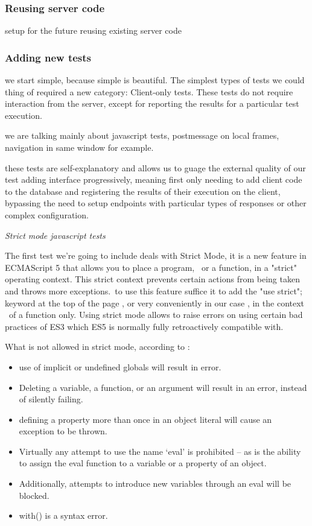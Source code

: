 \subsubsection{Reusing server code}
setup for the future
reusing existing server code

\subsubsection{Adding new tests}

we start simple, because simple is beautiful. The simplest types of tests we could thing of required a new category: Client-only tests.
These tests do not require interaction from the server, except for reporting the results for a particular test execution.

we are talking mainly about javascript tests, postmessage on local frames, navigation in same window for example.

these tests are self-explanatory and allows us to guage the external quality of our test adding interface progressively, meaning first only needing
to add client code to the database and registering the results of their execution on the client, bypassing the need to setup endpoints with particular types
of responses or other complex configuration. 

\emph{Strict mode javascript tests}

The first test we're going to include deals with Strict Mode, it is a new feature in ECMAScript 5 that allows you to place a program, \
or a function, in a "strict" operating context. This strict context prevents certain actions from being taken and throws more exceptions.\
to use this feature suffice it to add the  "use strict"; keyword at the top of the page , or very conveniently in our case , in the context \
of a function only. Using strict mode allows to raise errors on using certain bad practices of ES3 which ES5 is normally fully retroactively compatible with.\

What is not allowed in strict mode, according to \cite{resig}:
\begin{itemize}
 \item use of implicit or undefined globals will result in error.
 \item Deleting a variable, a function, or an argument will result in an error, instead of silently failing.
 \item defining a property more than once in an object literal will cause an exception to be thrown.
 \item Virtually any attempt to use the name ‘eval’ is prohibited – as is the ability to assign the eval function to a variable or a property of an object.
 \item Additionally, attempts to introduce new variables through an eval will be blocked.
 \item with(){} is a syntax error.
\end{itemize}

